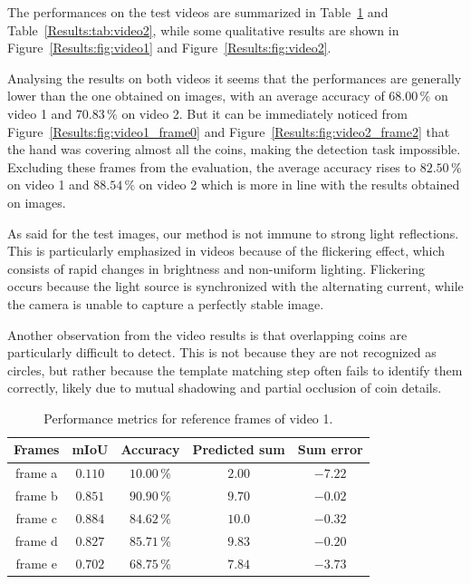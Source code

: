 
The performances on the test videos are summarized in Table~\ref{Results:tab:video1} and Table~\ref{Results:tab:video2}, while some qualitative results are shown in Figure~\ref{Results:fig:video1} and Figure~\ref{Results:fig:video2}.

Analysing the results on both videos it seems that the performances are generally lower than the one obtained on images, with an average accuracy of $68.00\,\%$ on video 1 and $70.83\,\%$ on video 2.
But it can be immediately noticed from Figure~\ref{Results:fig:video1_frame0} and Figure~\ref{Results:fig:video2_frame2} that the hand was covering almost all the coins, making the detection task impossible.
Excluding these frames from the evaluation, the average accuracy rises to $82.50\,\%$ on video 1 and $88.54\,\%$ on video 2 which is more in line with the results obtained on images.

As said for the test images, our method is not immune to strong light reflections.
This is particularly emphasized in videos because of the flickering effect, which consists of rapid changes in brightness and non-uniform lighting.
Flickering occurs because the light source is synchronized with the alternating current, while the camera is unable to capture a perfectly stable image.

Another observation from the video results is that overlapping coins are particularly difficult to detect.
This is not because they are not recognized as circles, but rather because the template matching step often fails to identify them correctly, likely due to mutual shadowing and partial occlusion of coin details.

\begin{table}[H]
\centering
\begin{tabular}{c|c|c|c|c}
\toprule
\textbf{Frames} & \textbf{mIoU} & \textbf{Accuracy} & \textbf{Predicted sum} & \textbf{Sum error} \\[4pt]
\midrule
frame a     & $0.110$     & $10.00\,\%$     & $2.00$     & $-7.22$ \\[8pt]
frame b     & $0.851$     & $90.90\,\%$     & $9.70$     & $-0.02$ \\[8pt]
frame c     & $0.884$     & $84.62\,\%$     & $10.0$     & $-0.32$ \\[8pt]
frame d     & $0.827$     & $85.71\,\%$     & $9.83$     & $-0.20$ \\[8pt]
frame e     & $0.702$     & $68.75\,\%$     & $7.84$     & $-3.73$ \\
\bottomrule
\end{tabular}
\caption{Performance metrics for reference frames of video 1.}
\label{Results:tab:video1}
\end{table}

